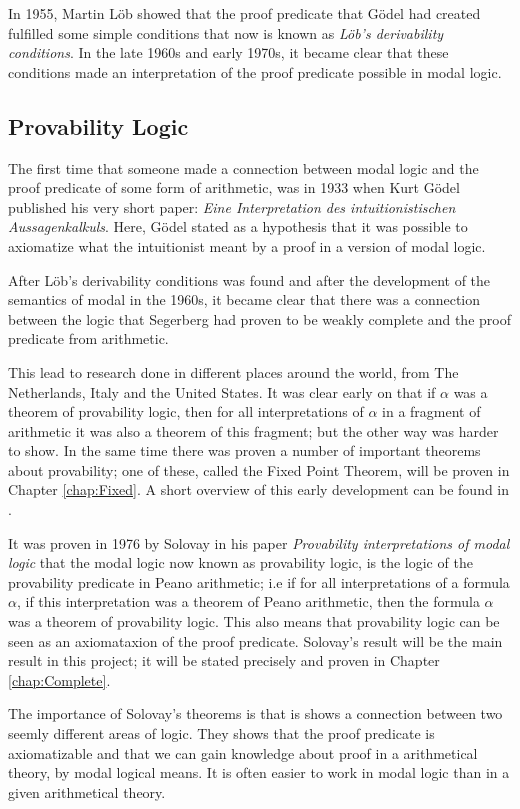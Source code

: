 \documentclass[../main.tex]{subfiles}
\begin{document}
In 1955, Martin Löb showed that the proof predicate that Gödel had created
fulfilled some simple conditions that now is known as \textit{Löb's derivability
conditions}. In the late 1960s and early 1970s, it became clear that these
conditions made an interpretation of the proof predicate possible in modal
logic.


\subsection{Provability Logic}
The first time that someone made a connection between modal logic and the proof
predicate of some form of arithmetic, was in 1933 when Kurt Gödel published his very short  paper:
\textit{Eine
Interpretation des intuitionistischen Aussagenkalkuls}. Here, Gödel
stated as a  hypothesis that it was possible to axiomatize what the
intuitionist meant by a proof in a version of modal logic.

After Löb's derivability conditions was found and after the development of the
semantics of modal in the 1960s, it became clear that there was a connection
between the logic that Segerberg had proven to be weakly complete and the proof
predicate from arithmetic.

This lead to research done in different places around the world, from The
Netherlands, Italy and the United States. It was clear early on that if
$\alpha$ was a theorem of provability logic, then for all interpretations of
$\alpha$ in a fragment of arithmetic it  was also a theorem of this fragment; but
the other way was harder to show. In the same time there was proven a number of
important theorems about provability; one of these, called the Fixed Point
Theorem,  will be proven in Chapter
\ref{chap:Fixed}.
A short overview of this early
development can be found in \parencite{Bool1991}.

It was proven in 1976 by Solovay in his paper \textit{Provability
interpretations of modal logic} that the modal
logic now known as provability logic, is the logic of the provability predicate
in Peano arithmetic; i.e if for all interpretations
of a formula $\alpha$, if this interpretation was a theorem of Peano
arithmetic,
then the formula $\alpha$ was a theorem of provability logic. This also means that
provability logic can be seen as an axiomataxion of the proof predicate.
Solovay's result will be the main result in this project; it will be stated
precisely and proven in Chapter \ref{chap:Complete}.

The importance of Solovay's theorems is that is shows a connection between two
seemly different areas of logic. They shows that the proof predicate is
axiomatizable and that we can gain knowledge about proof in a arithmetical
theory, by modal logical means. It is often easier to work in modal logic than
in a given arithmetical theory.
\end{document}
